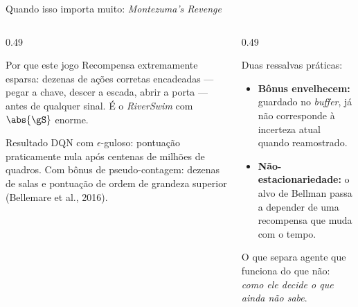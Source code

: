 \documentclass[aspectratio=169, 11pt]{beamer}
\begin{document}
\begin{frame}{Quando isso importa muito: \textit{Montezuma's Revenge}}
  \begin{columns}[T]
    \begin{column}{0.49\textwidth}
      \begin{defbox}{Por que este jogo}
        Recompensa extremamente esparsa: dezenas de ações corretas encadeadas --- pegar
        a chave, descer a escada, abrir a porta --- antes de qualquer sinal. É o
        \textit{RiverSwim} com $\abs{\gS}$ enorme.
      \end{defbox}
      \begin{teobox}{Resultado}
        DQN com $\epsilon$-guloso: pontuação praticamente nula após centenas de milhões
        de quadros. Com bônus de pseudo-contagem: dezenas de salas e pontuação de ordem
        de grandeza superior (Bellemare et al., 2016).
      \end{teobox}
    \end{column}
    \begin{column}{0.49\textwidth}
      \begin{alertabox}
        Duas ressalvas práticas:
        \begin{itemize}
          \item \textbf{Bônus envelhecem:} guardado no \textit{buffer}, já não
                corresponde à incerteza atual quando reamostrado.
          \item \textbf{Não-estacionariedade:} o alvo de Bellman passa a depender de uma
                recompensa que muda com o tempo.
        \end{itemize}
      \end{alertabox}
      \begin{ideiabox}
        O que separa agente que funciona do que não: \emph{como ele decide o que ainda
        não sabe}.
      \end{ideiabox}
    \end{column}
  \end{columns}
\end{frame}
\end{document}
